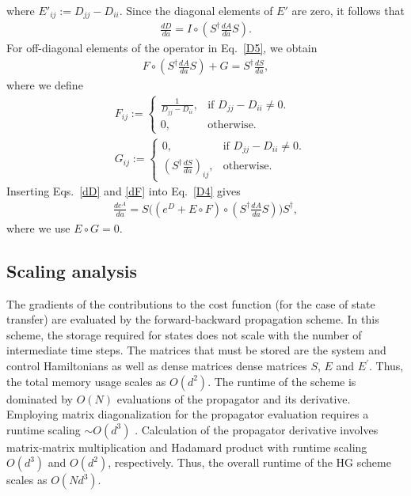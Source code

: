 \documentclass[letterpaper,10pt]{iopart}
\begin{document}
where $E'_{ij}:=D_{jj}-D_{ii}$. 
Since the diagonal elements of $E'$ are zero, it follows that
\begin{align}
\label{dD}
    \frac{dD}{da}=I\circ (S^\dagger\frac{dA}{da}S).
\end{align}
For off-diagonal elements of the operator in Eq.\ \eqref{D5}, we obtain
\begin{align}
\label{dF}
    F\circ (S^\dagger\frac{dA}{da}S)+G=S^\dagger\frac{dS}{da},
\end{align}
where we define 
\begin{align}
    &F_{ij}:=
  \begin{cases}
    \frac{1}{D_{jj}-D_{ii}},& \text{if $D_{jj}-D_{ii} \neq 0$}.\\
    0, & \text{otherwise}.
  \end{cases}\\
\nonumber  &G_{ij}:=
  \begin{cases}
    0, & \text{if $D_{jj}-D_{ii} \neq 0$}.\\
    (S^\dagger\frac{dS}{da})_{ij}, & \text{otherwise}.
\end{cases}
\end{align}
Inserting Eqs.\ \eqref{dD} and \eqref{dF} into Eq.\ \eqref{D4} gives
\begin{align}
\label{propagator der}
    \frac{de^A}{da}=S\big((e^D+E \circ F)\circ(S^\dagger \frac{dA}{da}S)\big)S^\dagger,
\end{align}
where we use $E\circ G=0$. 
\subsection{Scaling analysis }
The gradients of the contributions to the cost function (for the case of state transfer) are evaluated by the forward-backward propagation scheme. In this scheme, the storage required for states does not scale with the number of intermediate time steps. The matrices that must be stored are the system and control Hamiltonians as well as dense matrices dense matrices $S$, $E$ and $E^\prime$. Thus, the total memory usage scales as $O(d^2)$. The runtime of the scheme is dominated by $O(N)$ evaluations of the propagator and its derivative. Employing matrix diagonalization for the propagator evaluation requires a runtime scaling $\sim O(d^3)$ \cite{matridiagcomppan1999complexity}. Calculation of the propagator derivative involves matrix-matrix multiplication and Hadamard product with runtime scaling $O(d^3)$ and $O(d^2)$, respectively. Thus, the overall runtime of the HG scheme scales as $O(Nd^3)$. 
\end{document}

